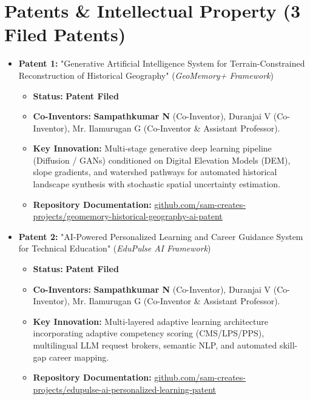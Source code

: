 \documentclass[letterpaper,11pt]{article}
\begin{document}
\section{Patents \& Intellectual Property (3 Filed Patents)}
  \begin{itemize}[leftmargin=0.15in, label={}]
    \item \textbf{Patent 1:} "Generative Artificial Intelligence System for Terrain-Constrained Reconstruction of Historical Geography" (\emph{GeoMemory+ Framework})
      \begin{itemize}[leftmargin=0.2in]
        \item \textbf{Status:} \textbf{Patent Filed}
        \item \textbf{Co-Inventors:} \textbf{Sampathkumar N} (Co-Inventor), Duranjai V (Co-Inventor), Mr. Ilamurugan G (Co-Inventor \& Assistant Professor).
        \item \textbf{Key Innovation:} Multi-stage generative deep learning pipeline (Diffusion / GANs) conditioned on Digital Elevation Models (DEM), slope gradients, and watershed pathways for automated historical landscape synthesis with stochastic spatial uncertainty estimation.
        \item \textbf{Repository Documentation:} \href{https://github.com/sam-creates-projects/geomemory-historical-geography-ai-patent}{\underline{github.com/sam-creates-projects/geomemory-historical-geography-ai-patent}}
      \end{itemize}
      \vspace{-3pt}

    \item \textbf{Patent 2:} "AI-Powered Personalized Learning and Career Guidance System for Technical Education" (\emph{EduPulse AI Framework})
      \begin{itemize}[leftmargin=0.2in]
        \item \textbf{Status:} \textbf{Patent Filed}
        \item \textbf{Co-Inventors:} \textbf{Sampathkumar N} (Co-Inventor), Duranjai V (Co-Inventor), Mr. Ilamurugan G (Co-Inventor \& Assistant Professor).
        \item \textbf{Key Innovation:} Multi-layered adaptive learning architecture incorporating adaptive competency scoring (CMS/LPS/PPS), multilingual LLM request brokers, semantic NLP, and automated skill-gap career mapping.
        \item \textbf{Repository Documentation:} \href{https://github.com/sam-creates-projects/edupulse-ai-personalized-learning-patent}{\underline{github.com/sam-creates-projects/edupulse-ai-personalized-learning-patent}}
      \end{itemize}
      \vspace{-3pt}


\end{itemize}
\end{document}
